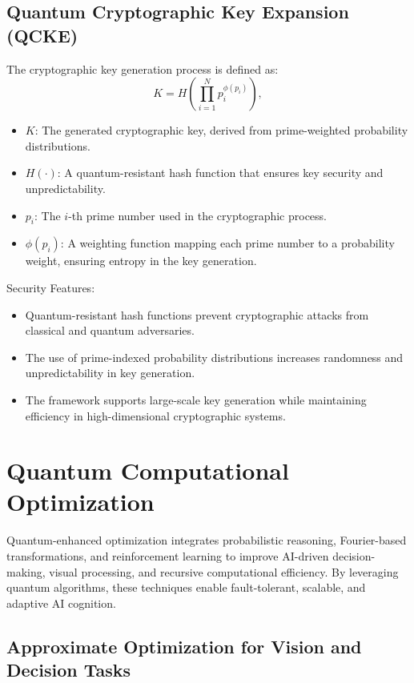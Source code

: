 \documentclass{article}
\theoremstyle{plain}
\begin{document}
\begin{itemize}
\begin{itemize}
\subsection{Quantum Cryptographic Key Expansion (QCKE)}
The cryptographic key generation process is defined as:
\begin{equation}
    K = H\left( \prod_{i=1}^{N} p_i^{\phi(p_i)} \right),
\end{equation}
\begin{itemize}
    \item $K$: The generated cryptographic key, derived from prime-weighted probability distributions.
    \item $H(\cdot)$: A quantum-resistant hash function that ensures key security and unpredictability.
    \item $p_i$: The $i$-th prime number used in the cryptographic process.
    \item $\phi(p_i)$: A weighting function mapping each prime number to a probability weight, ensuring entropy in the key generation.
\end{itemize}

Security Features:
\begin{itemize}
    \item Quantum-resistant hash functions prevent cryptographic attacks from classical and quantum adversaries.
    \item The use of prime-indexed probability distributions increases randomness and unpredictability in key generation.
    \item The framework supports large-scale key generation while maintaining efficiency in high-dimensional cryptographic systems.
\end{itemize}
   
\section{Quantum  Computational Optimization}

Quantum-enhanced optimization integrates probabilistic reasoning, Fourier-based transformations, and reinforcement learning to improve AI-driven decision-making, visual processing, and recursive computational efficiency. By leveraging quantum algorithms, these techniques enable fault-tolerant, scalable, and adaptive AI cognition.

\subsection{Approximate Optimization for Vision and Decision Tasks}


\end{itemize}
\end{itemize}
\end{document}
